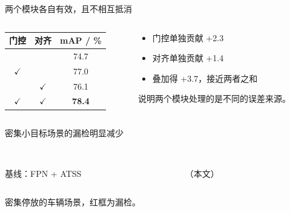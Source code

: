 \begin{frame}{两个模块各自有效，且不相互抵消}
  \begin{columns}[T, onlytextwidth]
    \begin{column}{0.52\textwidth}
      \begin{table}
        \centering\small
        \begin{tabular}{cc S[table-format=2.1]}
          \toprule
          {门控} & {对齐} & {mAP / \%} \\
          \midrule
                     &            & 74.7 \\
          $\checkmark$ &            & 77.0 \\
                     & $\checkmark$ & 76.1 \\
          $\checkmark$ & $\checkmark$ & \bfseries 78.4 \\
          \bottomrule
        \end{tabular}
      \end{table}
    \end{column}
    \begin{column}{0.44\textwidth}
      \begin{itemize}
        \setlength{\itemsep}{0.7em}
        \item 门控单独贡献 \alert{+2.3}
        \item 对齐单独贡献 \alert{+1.4}
        \item 叠加得 +3.7，接近两者之和
      \end{itemize}
      \vspace{0.6em}
      {\footnotesize\color{AcadMuted}
       说明两个模块处理的是不同的误差来源。}
    \end{column}
  \end{columns}
\end{frame}

\begin{frame}{密集小目标场景的漏检明显减少}
  \begin{columns}[c, onlytextwidth]
    \begin{column}{0.48\textwidth}
      \centering
      \\[0.4em]
      {\footnotesize 基线：FPN + ATSS}
    \end{column}
    \begin{column}{0.48\textwidth}
      \centering
      \\[0.4em]
      {\footnotesize \ourmethod{}（本文）}
    \end{column}
  \end{columns}
  \vspace{0.8em}
  \centering
  {\small 密集停放的车辆场景，红框为漏检。}
\end{frame}
